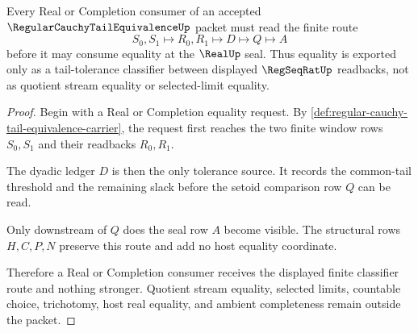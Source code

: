 \begin{theorem}
\label{thm:regular-cauchy-tail-equivalence-real-handoff}
Every Real or Completion consumer of an accepted $\RegularCauchyTailEquivalenceUp$ packet must read the finite route
$$
S_0,S_1 \longmapsto R_0,R_1 \longmapsto D \longmapsto Q \longmapsto A
$$
before it may consume equality at the $\RealUp$ seal. Thus equality is exported only as a tail-tolerance classifier between displayed $\RegSeqRatUp$ readbacks, not as quotient stream equality or selected-limit equality.
\end{theorem}
\begin{proof}
Begin with a Real or Completion equality request. By \autoref{def:regular-cauchy-tail-equivalence-carrier}, the request first reaches the two finite window rows $S_0,S_1$ and their readbacks $R_0,R_1$.

The dyadic ledger $D$ is then the only tolerance source. It records the common-tail threshold and the remaining slack before the setoid comparison row $Q$ can be read.

Only downstream of $Q$ does the seal row $A$ become visible. The structural rows $H,C,P,N$ preserve this route and add no host equality coordinate.

Therefore a Real or Completion consumer receives the displayed finite classifier route and nothing stronger. Quotient stream equality, selected limits, countable choice, trichotomy, host real equality, and ambient completeness remain outside the packet.
\end{proof}


